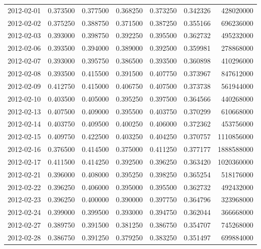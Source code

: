 \begin{tabular}{lrrrrrr}
2012-02-01 &    0.373500 &    0.377500 &    0.368250 &    0.373250 &    0.342326 &   428020000 \\
2012-02-02 &    0.375250 &    0.388750 &    0.371500 &    0.387250 &    0.355166 &   696236000 \\
2012-02-03 &    0.393000 &    0.398750 &    0.392250 &    0.395500 &    0.362732 &   495232000 \\
2012-02-06 &    0.393500 &    0.394000 &    0.389000 &    0.392500 &    0.359981 &   278868000 \\
2012-02-07 &    0.393000 &    0.395750 &    0.386500 &    0.393500 &    0.360898 &   410296000 \\
2012-02-08 &    0.393500 &    0.415500 &    0.391500 &    0.407750 &    0.373967 &   847612000 \\
2012-02-09 &    0.412750 &    0.415000 &    0.406750 &    0.407500 &    0.373738 &   561944000 \\
2012-02-10 &    0.403500 &    0.405000 &    0.395250 &    0.397500 &    0.364566 &   440268000 \\
2012-02-13 &    0.407500 &    0.409000 &    0.395500 &    0.403750 &    0.370299 &   610668000 \\
2012-02-14 &    0.403750 &    0.409500 &    0.400250 &    0.406000 &    0.372362 &   453756000 \\
2012-02-15 &    0.409750 &    0.422500 &    0.403250 &    0.404250 &    0.370757 &  1110856000 \\
2012-02-16 &    0.376500 &    0.414500 &    0.375000 &    0.411250 &    0.377177 &  1888588000 \\
2012-02-17 &    0.411500 &    0.414250 &    0.392500 &    0.396250 &    0.363420 &  1020360000 \\
2012-02-21 &    0.396000 &    0.408000 &    0.395250 &    0.398250 &    0.365254 &   518176000 \\
2012-02-22 &    0.396250 &    0.406000 &    0.395000 &    0.395500 &    0.362732 &   492432000 \\
2012-02-23 &    0.396250 &    0.400000 &    0.390000 &    0.397750 &    0.364796 &   323968000 \\
2012-02-24 &    0.399000 &    0.399500 &    0.393000 &    0.394750 &    0.362044 &   366668000 \\
2012-02-27 &    0.389750 &    0.391500 &    0.381250 &    0.386750 &    0.354707 &   745268000 \\
2012-02-28 &    0.386750 &    0.391250 &    0.379250 &    0.383250 &    0.351497 &   699884000 \\

\end{tabular}
